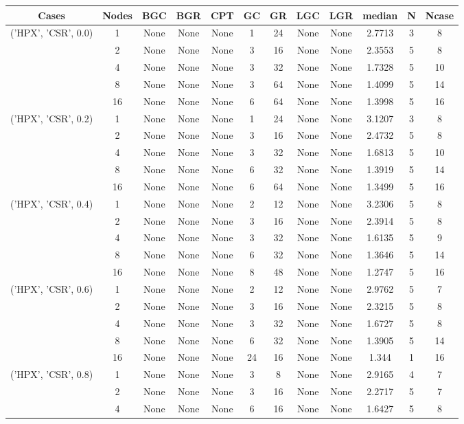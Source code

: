 \begin{tabular}{cccccccccccc}
\hline
Cases & Nodes& BGC& BGR& CPT& GC& GR& LGC& LGR& median & N & Ncase \\
\hline
\multirow{5}{*}{('HPX', 'CSR', 0.0)}& 1& None& None& None& 1& 24& None& None& 2.7713& 3& 8\\
& 2& None& None& None& 3& 16& None& None& 2.3553& 5& 8\\
& 4& None& None& None& 3& 32& None& None& 1.7328& 5& 10\\
& 8& None& None& None& 3& 64& None& None& 1.4099& 5& 14\\
& 16& None& None& None& 6& 64& None& None& 1.3998& 5& 16\\
\hline
\multirow{5}{*}{('HPX', 'CSR', 0.2)}& 1& None& None& None& 1& 24& None& None& 3.1207& 3& 8\\
& 2& None& None& None& 3& 16& None& None& 2.4732& 5& 8\\
& 4& None& None& None& 3& 32& None& None& 1.6813& 5& 10\\
& 8& None& None& None& 6& 32& None& None& 1.3919& 5& 14\\
& 16& None& None& None& 6& 64& None& None& 1.3499& 5& 16\\
\hline
\multirow{5}{*}{('HPX', 'CSR', 0.4)}& 1& None& None& None& 2& 12& None& None& 3.2306& 5& 8\\
& 2& None& None& None& 3& 16& None& None& 2.3914& 5& 8\\
& 4& None& None& None& 3& 32& None& None& 1.6135& 5& 9\\
& 8& None& None& None& 6& 32& None& None& 1.3646& 5& 14\\
& 16& None& None& None& 8& 48& None& None& 1.2747& 5& 16\\
\hline
\multirow{5}{*}{('HPX', 'CSR', 0.6)}& 1& None& None& None& 2& 12& None& None& 2.9762& 5& 7\\
& 2& None& None& None& 3& 16& None& None& 2.3215& 5& 8\\
& 4& None& None& None& 3& 32& None& None& 1.6727& 5& 8\\
& 8& None& None& None& 6& 32& None& None& 1.3905& 5& 14\\
& 16& None& None& None& 24& 16& None& None& 1.344& 1& 16\\
\hline
\multirow{5}{*}{('HPX', 'CSR', 0.8)}& 1& None& None& None& 3& 8& None& None& 2.9165& 4& 7\\
& 2& None& None& None& 3& 16& None& None& 2.2717& 5& 7\\
& 4& None& None& None& 6& 16& None& None& 1.6427& 5& 8\\

\end{tabular}
